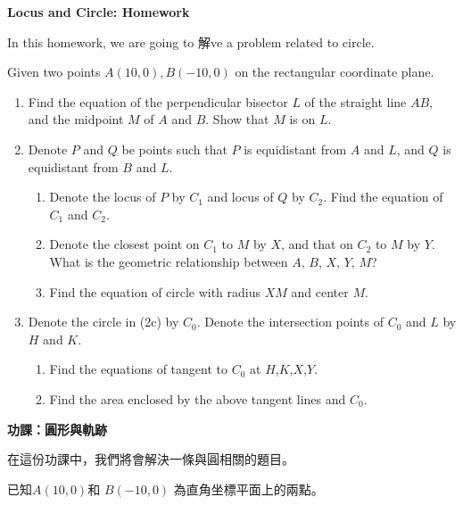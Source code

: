 \documentclass[12pt]{article}
\begin{document}
    \begin{center}
        \textbf{Locus and Circle: Homework}
    \end{center}

    In this homework, we are going to 解ve a problem related to circle.
    
    Given two points $A(10,0), B(-10,0)$ on the rectangular coordinate plane.

    \begin{enumerate}
        \item Find the equation of the perpendicular bisector $L$ of the straight line $AB$, and the midpoint $M$ of $A$ and $B$. Show that $M$ is on $L$.
        \item Denote $P$ and $Q$ be points such that $P$ is equidistant from $A$ and $L$, and $Q$ is equidistant from $B$ and $L$. \begin{enumerate}
            \item Denote the locus of $P$ by $C_1$ and locus of $Q$ by $C_2$. Find the equation of $C_1$ and $C_2$.
            \item Denote the closest point on $C_1$ to $M$ by $X$, and that on $C_2$ to $M$ by $Y$. What is the geometric relationship between $A$, $B$, $X$, $Y$, $M$?
            \item Find the equation of circle with radius $XM$ and center $M$.
        \end{enumerate}
        \item Denote the circle in (2c) by $C_0$. Denote the intersection points of $C_0$ and $L$ by $H$ and $K$. \begin{enumerate}
            \item Find the equations of tangent to $C_0$ at $H$,$K$,$X$,$Y$.
            \item Find the area enclosed by the above tangent lines and $C_0$.
        \end{enumerate}
    \end{enumerate}

    \newpage

    \begin{center}
        \textbf{功課：圓形與軌跡}
    \end{center}

    在這份功課中，我們將會解決一條與圓相關的題目。
    
    已知$A(10,0)$和 $B(-10,0)$ 為直角坐標平面上的兩點。
\end{document}
